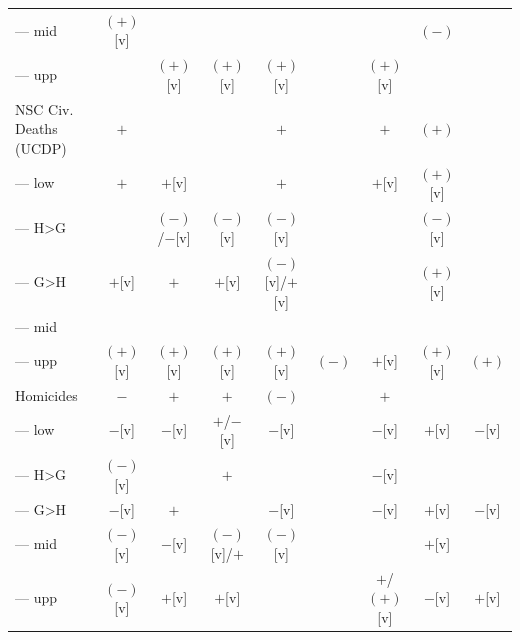 \documentclass[12pt]{article}
\begin{document}
\begin{table}
\begin{tabular}{lcccccccc}
--- mid                   & $(+)$[v]            &                     &              &                 &          &                               & $(-)$                          & \\
--- upp                   &                     & $(+)$[v]            & $(+)$[v]     & $(+)$[v]        &          & $(+)$[v]                      &                                & \\
NSC Civ. Deaths (UCDP)    & $+$                 &                     &              & $+$             &          & $+$                           & $(+)$                          & \\
--- low                   & $+$                 & $+$[v]              &              & $+$             &          & $+$[v]                        & $(+)$[v]                       & \\
--- H>G                   &                     & $(-)$/$-$[v]        & $(-)$[v]     & $(-)$[v]        &          &                               & $(-)$[v]                       & \\
--- G>H                   & $+$[v]              & $+$                 & $+$[v]       & $(-)$[v]/$+$[v] &          &                               & $(+)$[v]                       & \\
--- mid                   &                     &                     &              &                 &          &                               &                                & \\
--- upp                   & $(+)$[v]            & $(+)$[v]            & $(+)$[v]     & $(+)$[v]        & $(-)$    & $+$[v]                        & $(+)$[v]                       & $(+)$ \\
Homicides                 & $-$                 & $+$                 & $+$          & $(-)$           &          & $+$                           &                                & \\
--- low                   & $-$[v]              & $-$[v]              & $+$/$-$[v]   & $-$[v]          &          & $-$[v]                        & $+$[v]                         & $-$[v] \\
--- H>G                   & $(-)$[v]            &                     & $+$          &                 &          & $-$[v]                        &                                & \\
--- G>H                   & $-$[v]              & $+$                 &              & $-$[v]          &          & $-$[v]                        & $+$[v]                         & $-$[v] \\
--- mid                   & $(-)$[v]            & $-$[v]              & $(-)$[v]/$+$ & $(-)$[v]        &          &                               & $+$[v]                         & \\
--- upp                   & $(-)$[v]            & $+$[v]              & $+$[v]       &                 &          & $+$/$(+)$[v]                  & $-$[v]                         & $+$[v] \\
\bottomrule
\end{tabular}
\end{table}
\end{document}
